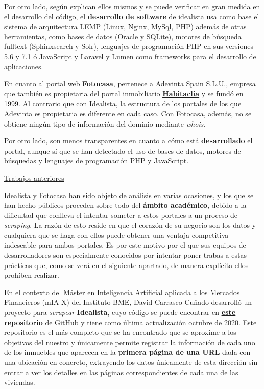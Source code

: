 \documentclass[12pt]{article}
\begin{document}
Por otro lado, según explican ellos mismos y se puede verificar en gran medida en el desarrollo del código, el \textbf{desarrollo de software }de idealista usa como base el sistema de arquitectura LEMP (Linux, Nginx, MySql, PHP) además de otras herramientas, como bases de datos (Oracle y SQLite), motores de búsqueda fulltext (Sphinxsearch y Solr), lenguajes de programación PHP en sus versiones 5.6 y 7.1 ó JavaScript y Laravel y Lumen como frameworks para el desarrollo de aplicaciones.

En cuanto al portal web \href{https://www.fotocasa.es/es/}{\textbf{\underline{Fotocasa}}}, pertenece a Adevinta Spain S.L.U., empresa que también es propietaria del portal inmobiliario \href{https://www.habitaclia.com/madrid}{\textbf{\underline{Habitaclia}}} y se fundó en 1999. Al contrario que con Idealista, la estructura de los portales de los que Adevinta es propietaria es diferente en cada caso. Con Fotocasa, además, no se obtiene ningún tipo de información del dominio mediante \textit{whois}. 

Por otro lado, son menos transparentes en cuanto a cómo está \textbf{desarrollado} el portal, aunque sí que se han detectado el uso de bases de datos, motores de búsquedas y lenguajes de programación PHP y JavaScript.

\underline{Trabajos anteriores}

Idealista y Fotocasa han sido objeto de análisis en varias ocasiones, y los que se han hecho públicos proceden sobre todo del \textbf{ámbito académico}, debido a la dificultad que conlleva el intentar someter a estos portales a un proceso de \textit{scraping}. La razón de esto reside en que el corazón de su negocio son los datos y cualquiera que se haga con ellos puede obtener una ventaja competitiva indeseable para ambos portales. Es por este motivo por el que sus equipos de desarrolladores son especialmente conocidos por intentar poner trabas a estas prácticas que, como se verá en el siguiente apartado, de manera explícita ellos prohíben realizar.

En el contexto del Máster en Inteligencia Artificial aplicada a los Mercados Financieros (mIA-X) del Instituto BME, David Carrasco Cuñado desarrolló un proyecto para \textit{scrapear} \textbf{Idealista}, cuyo código se puede encontrar en \href{https://github.com/David-Carrasco/Scrapy-Idealista}{\textbf{\underline{este repositorio}}} de GitHub y tiene como última actualización octubre de 2020. Este repositorio es el más completo que se ha encontrado que se aproxime a los objetivos del nuestro y únicamente permite registrar la información de cada uno de los inmuebles que aparecen en la\textbf{ primera página de una URL} dada con una ubicación en concreto, extrayendo los datos únicamente de esta dirección sin entrar a ver los detalles en las páginas correspondientes de cada una de las viviendas. 
\end{document}
